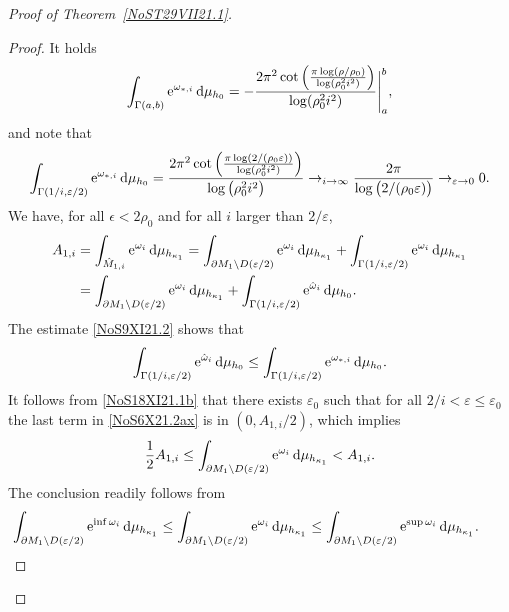 \documentclass[pdftex]{sigma}
\numberwithin{equation}{section}
\newcommand{\zMone}{\red{{\hat M}_{1,i}}}
\newcommand{\hmv}{\red{\hat \omega}}
\newcommand{\repsilon}{ {\varepsilon}}
\newcommand{\rhozero}{\red{\rho_0}}
\newcommand{\red}[1]{{\color{red}#1}}
\newcommand{\mv}{\omega}%
\renewcommand{\red}[1]{#1}
\begin{document}
\begin{proof}[Proof of Theorem~\ref{NoST29VII21.1}]
\begin{proof}
It holds
\begin{equation*}%
 \int_{\Gamma(a,b)} {\rm e}^{\mv_{*,i} }\,{\rm d}\mu_{h_0}
 = -\frac{2 \pi ^2 \cot \Big(\frac{\pi
 \log (\rho/\rho_0 )}{\log
(\rho_0^2i^2)}\Big)}{\log
(\rho_0^2i^2)}\Bigg|^b_a,
\end{equation*}
and note that
\begin{equation}\label{NoS18XI21.1b}
 \int_{\Gamma(1/i,\repsilon/2)} {\rm e}^{\mv_{*,i} }\, {\rm d}\mu_{h_0}
 = \frac{2 \pi ^2 \cot \Big(\frac{\pi
 \log (2/(\rho_0\repsilon))}{\log
 (\rho_0^2i^2)}\Big)}{\log
 \big(\rho_0^2i^2\big)}
 \to_{i\to\infty}
 \frac{2\pi }{\log \big(2/(\rho_0\repsilon)\big)}
 \to_{\repsilon\to 0} 0.
\end{equation}
We have, for all $\epsilon< 2\rhozero$ and for all $i$ larger than $2/\repsilon$,
\begin{align}
 A_{1,i}
 &=
 \int_{\zMone} {\rm e}^{\mv_i} \,{\rm d}\mu_{h_{\kappa_1}}= \int_{\red {\partial M_1 \setminus D(\repsilon/2)}} {\rm e}^{\mv_i}\, {\rm d}\mu_{h_{\kappa_1}}
 +
 \int_{\Gamma(1/i,\repsilon/2) } {\rm e}^{\mv_i}\, {\rm d}\mu_{h_{\kappa_1}}
 \nonumber
\\
 &=
 \int_{\red{\partial M_1 \setminus D(\repsilon/2)}} {\rm e}^{\mv_i}\, {\rm d}\mu_{h_{\kappa_1}}
 +
 \int_{\Gamma(1/i,\repsilon/2) } {\rm e}^{\hmv_i}\, {\rm d}\mu_{h_{0}}.\label{NoS6X21.2ax}
\end{align}
The estimate \eqref{NoS9XI21.2} shows that
\begin{gather*}
\int_{\Gamma(1/i,\repsilon/2) } {\rm e}^{\hmv_i} \,{\rm d}\mu_{h_0}
 \le
 \int_{\Gamma(1/i,\repsilon/2) } {\rm e}^{\mv_{*,i} }\, {\rm d}\mu_{h_0}. %
\end{gather*}
It follows from \eqref{NoS18XI21.1b} that there exists $\repsilon_0$ such that for all $2/{i} <\repsilon\le \repsilon_0$ the last term in \eqref{NoS6X21.2ax} is in $(0,A_{1,i}/2)$,
which implies
\begin{eqnarray*}
 \frac 12 A_{1,i} \le \int_{\red{\partial M_1 \setminus D(\repsilon/2)}} {\rm e}^{\mv_i} \,{\rm d}\mu_{h_{\kappa_1}}
 < A_{1,i}. %
\end{eqnarray*}
The conclusion readily follows from
\begin{gather*}
 \int_{\red{\partial M_1 \setminus D(\repsilon/2)}} {\rm e}^{\inf \mv_i }\, {\rm d}\mu_{h_{\kappa_1} }
 \le \int_{\red{\partial M_1 \setminus D(\repsilon/2)}} {\rm e}^{\mv_i} \,{\rm d}\mu_{h_{\kappa_1} }
 \le \int_{\red{\partial M_1 \setminus D(\repsilon/2)}} {\rm e}^{\sup \mv_i} \,{\rm d}\mu_{h_{\kappa_1}}.
 \tag*{\qed}
\end{gather*}
\renewcommand{\qed}{}
\end{proof}


\end{proof}
\end{document}
